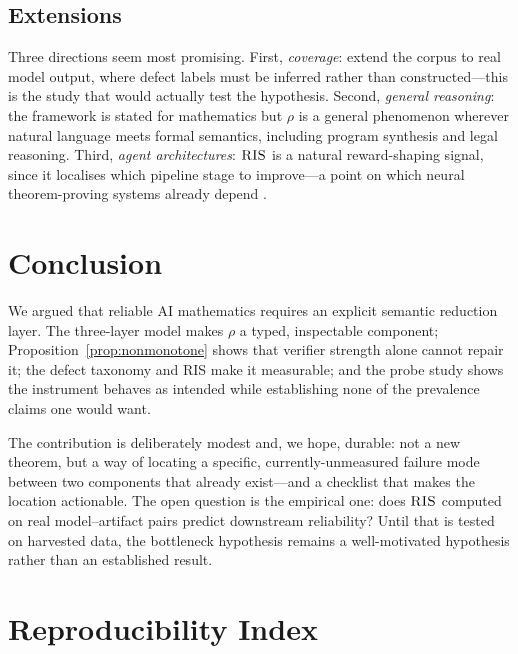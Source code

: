 \documentclass[11pt,a4paper]{article}
\theoremstyle{plain}
\theoremstyle{definition}
\newcommand{\RIS}{\textnormal{\textsc{RIS}}}
\begin{document}
\subsection{Extensions}

Three directions seem most promising. First, \emph{coverage}: extend the
corpus to real model output, where defect labels must be inferred rather
than constructed---this is the study that would actually test the
hypothesis. Second, \emph{general reasoning}: the framework is stated for
mathematics but $\rho$ is a general phenomenon wherever natural language
meets formal semantics, including program synthesis and legal reasoning.
Third, \emph{agent architectures}: $\RIS$ is a natural reward-shaping
signal, since it localises which pipeline stage to improve---a point on
which neural theorem-proving systems already depend
\citep{alphaproof2025}.

\section{Conclusion}
\label{sec:concl}

We argued that reliable AI mathematics requires an explicit semantic
reduction layer. The three-layer model makes $\rho$ a typed, inspectable
component; Proposition~\ref{prop:nonmonotone} shows that verifier strength
alone cannot repair it; the defect taxonomy and \RIS{} make it measurable;
and the probe study shows the instrument behaves as intended while
establishing none of the prevalence claims one would want.

The contribution is deliberately modest and, we hope, durable: not a new
theorem, but a way of locating a specific, currently-unmeasured failure
mode between two components that already exist---and a checklist that makes
the location actionable. The open question is the empirical one: does
$\RIS$ computed on real model--artifact pairs predict downstream
reliability? Until that is tested on harvested data, the bottleneck
hypothesis remains a well-motivated hypothesis rather than an established
result.




\appendix
\section{Reproducibility Index}
\label{app:repro}
\end{document}
